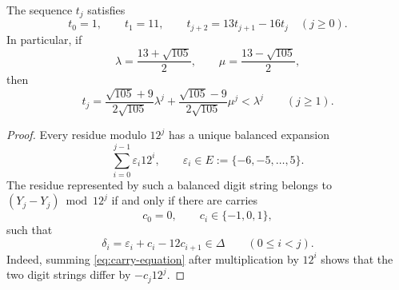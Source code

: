 \documentclass[10pt,a4paper]{amsart}
\begin{document}
\begin{lemma}\label{lem:difference-recurrence}
The sequence $t_j$ satisfies
\[
 t_0=1,\qquad t_1=11,
 \qquad
 t_{j+2}=13t_{j+1}-16t_j\quad(j\ge0).
\]
In particular, if
\[
 \lambda=\frac{13+\sqrt{105}}2,
 \qquad
 \mu=\frac{13-\sqrt{105}}2,
\]
then
\begin{equation}\label{eq:t-closed}
 t_j=
 \frac{\sqrt{105}+9}{2\sqrt{105}}\lambda^j
 +
 \frac{\sqrt{105}-9}{2\sqrt{105}}\mu^j
 <\lambda^j
 \qquad(j\ge1).
\end{equation}
\end{lemma}

\begin{proof}
Every residue modulo $12^j$ has a unique balanced expansion
\[
 \sum_{i=0}^{j-1}\varepsilon_i12^i,
 \qquad
 \varepsilon_i\in E:=\{-6,-5,\ldots,5\}.
\]
The residue represented by such a balanced digit string belongs to
\((Y_j-Y_j)\bmod 12^j\) if and only if there are carries
\[
 c_0=0,
 \qquad
 c_i\in\{-1,0,1\},
\]
such that
\begin{equation}\label{eq:carry-equation}
 \delta_i=\varepsilon_i+c_i-12c_{i+1}\in\Delta
 \qquad(0\le i<j).
\end{equation}
Indeed, summing \eqref{eq:carry-equation} after multiplication by $12^i$
shows that the two digit strings differ by $-c_j12^j$.


\end{proof}
\end{document}
